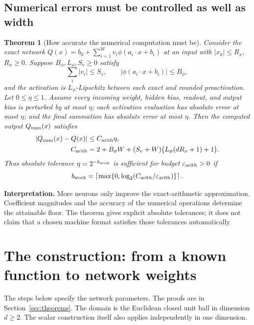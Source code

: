 \documentclass[11pt,letterpaper]{article}
\newcommand{\eps}{\varepsilon}
\newtheorem{theorem}{Theorem}
\theoremstyle{definition}
\theoremstyle{remark}
\begin{document}
\subsection{Numerical errors must be controlled as well as width}
\begin{theorem}[How accurate the numerical computation must be]\label{thm:arithmetic}
Consider the exact network
\(Q(x)=b_0+\sum_{i=1}^Wv_i\phi(a_i\cdot x+b_i)\)
at an input with \(|x_k|\le R_x\), \(R_x\ge0\).
Suppose \(B_\phi,L_\phi,S_v\ge0\) satisfy
\[
 \sum_i|v_i|\le S_v,\qquad
 |\phi(a_i\cdot x+b_i)|\le B_\phi,
\]
and the activation is \(L_\phi\)-Lipschitz between each exact and rounded
preactivation. Let \(0\le\eta\le1\).
Assume every incoming weight, hidden bias, readout, and output bias is perturbed
by at most \(\eta\); each activation evaluation has absolute error at most
\(\eta\); and the final summation has absolute error at most \(\eta\).
Then the computed output \(Q_{\rm num}(x)\) satisfies
\begin{align}
 |Q_{\rm num}(x)-Q(x)|&\le C_{\rm arith}\eta,\label{eq:arith}\\
 C_{\rm arith}&=2+B_\phi W+
        (S_v+W)\bigl(L_\phi(dR_x+1)+1\bigr).\nonumber
\end{align}
Thus absolute tolerance \(\eta=2^{-b_{\rm work}}\) is sufficient for budget
\(\eps_{\rm arith}>0\) if
\[
 b_{\rm work}=
 \left\lceil\max\{0,\log_2(C_{\rm arith}/\eps_{\rm arith})\}\right\rceil.
\]
\end{theorem}
\textbf{Interpretation.} More neurons only improve the exact-arithmetic
approximation. Coefficient magnitudes and the accuracy of the numerical
operations determine the attainable floor. The theorem gives explicit
absolute tolerances; it does not claim that a chosen machine format
satisfies those tolerances automatically.

\section{The construction: from a known function to network weights}\label{sec:construction}
The steps below specify the network parameters. The proofs are in
Section~\ref{sec:theorems}.
The domain is the Euclidean closed unit ball in dimension \(d\ge2\).
The scalar construction itself also applies independently in one dimension.
\end{document}
